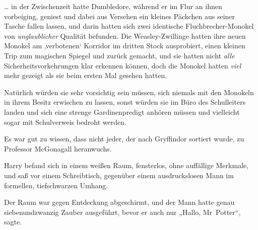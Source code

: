 … in der Zwischenzeit hatte Dumbledore, während er im Flur an ihnen vorbeiging, geniest und dabei aus Versehen ein kleines Päckchen aus seiner Tasche fallen lassen, und darin hatten sich zwei identische Fluchbrecher-Monokel von \emph{unglaublicher} Qualität befunden. Die Weasley-Zwillinge hatten ihre neuen Monokel am ‚verbotenen‘ Korridor im dritten Stock ausprobiert, einen kleinen Trip zum magischen Spiegel und zurück gemacht, und sie hatten nicht \emph{alle} Sicherheitsvorkehrungen klar erkennen können, doch die Monokel hatten \emph{viel} mehr gezeigt als sie beim ersten Mal gesehen hatten.

Natürlich würden sie sehr vorsichtig sein müssen, sich niemals mit den Monokeln in ihrem Besitz erwischen zu lassen, sonst würden sie im Büro des Schulleiters landen und sich eine strenge Gardinenpredigt anhören müssen und vielleicht sogar mit Schulverweis bedroht werden.

Es war gut zu wissen, dass nicht jeder, der nach Gryffindor sortiert wurde, zu Professor McGonagall heranwuchs.

\later

Harry befand sich in einem weißen Raum, fensterlos, ohne auffällige Merkmale, und saß vor einem Schreibtisch, gegenüber einem ausdruckslosen Mann im formellen, tiefschwarzen Umhang.

Der Raum war gegen Entdeckung abgeschirmt, und der Mann hatte genau siebenundzwanzig Zauber ausgeführt, bevor er auch nur
„Hallo, Mr~Potter“, sagte.

